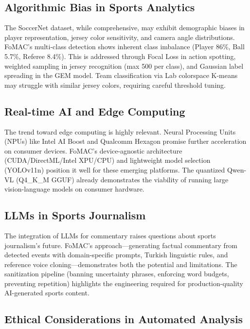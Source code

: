 \documentclass[10pt,twocolumn,a4paper]{article}
\begin{document}
\subsection{Algorithmic Bias in Sports Analytics}

The SoccerNet dataset, while comprehensive, may exhibit demographic biases in player representation, jersey color sensitivity, and camera angle distributions. FoMAC's multi-class detection shows inherent class imbalance (Player 86\%, Ball 5.7\%, Referee 8.4\%). This is addressed through Focal Loss in action spotting, weighted sampling in jersey recognition (max 500 per class), and Gaussian label spreading in the GEM model. Team classification via Lab colorspace K-means may struggle with similar jersey colors, requiring careful threshold tuning.

\subsection{Real-time AI and Edge Computing}

The trend toward edge computing is highly relevant. Neural Processing Units (NPUs) like Intel AI Boost and Qualcomm Hexagon promise further acceleration on consumer devices. FoMAC's device-agnostic architecture (CUDA/DirectML/Intel XPU/CPU) and lightweight model selection (YOLOv11n) position it well for these emerging platforms. The quantized Qwen-VL (Q4\_K\_M GGUF) already demonstrates the viability of running large vision-language models on consumer hardware.

\subsection{LLMs in Sports Journalism}

The integration of LLMs for commentary raises questions about sports journalism's future. FoMAC's approach---generating factual commentary from detected events with domain-specific prompts, Turkish linguistic rules, and reference voice cloning---demonstrates both the potential and limitations. The sanitization pipeline (banning uncertainty phrases, enforcing word budgets, preventing repetition) highlights the engineering required for production-quality AI-generated sports content.

\subsection{Ethical Considerations in Automated Analysis}
\end{document}
